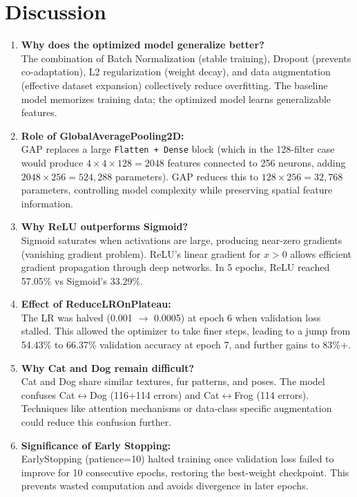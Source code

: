 \documentclass[11pt]{article}
\begin{document}
\section{Discussion}
\begin{enumerate}
    \item \textbf{Why does the optimized model generalize better?}\\
    The combination of Batch Normalization (stable training), Dropout (prevents co-adaptation), L2 regularization (weight decay), and data augmentation (effective dataset expansion) collectively reduce overfitting. The baseline model memorizes training data; the optimized model learns generalizable features.

    \item \textbf{Role of GlobalAveragePooling2D:}\\
    GAP replaces a large \texttt{Flatten + Dense} block (which in the 128-filter case would produce $4\times4\times128 = 2048$ features connected to 256 neurons, adding $2048\times256 = 524,288$ parameters). GAP reduces this to $128\times256 = 32,768$ parameters, controlling model complexity while preserving spatial feature information.

    \item \textbf{Why ReLU outperforms Sigmoid?}\\
    Sigmoid saturates when activations are large, producing near-zero gradients (vanishing gradient problem). ReLU's linear gradient for $x>0$ allows efficient gradient propagation through deep networks. In 5 epochs, ReLU reached 57.05\% vs Sigmoid's 33.29\%.

    \item \textbf{Effect of ReduceLROnPlateau:}\\
    The LR was halved (0.001 $\rightarrow$ 0.0005) at epoch 6 when validation loss stalled. This allowed the optimizer to take finer steps, leading to a jump from 54.43\% to 66.37\% validation accuracy at epoch 7, and further gains to 83\%+.

    \item \textbf{Why Cat and Dog remain difficult?}\\
    Cat and Dog share similar textures, fur patterns, and poses. The model confuses Cat$\leftrightarrow$Dog (116+114 errors) and Cat$\leftrightarrow$Frog (114 errors). Techniques like attention mechanisms or data-class specific augmentation could reduce this confusion further.

    \item \textbf{Significance of Early Stopping:}\\
    EarlyStopping (patience=10) halted training once validation loss failed to improve for 10 consecutive epochs, restoring the best-weight checkpoint. This prevents wasted computation and avoids divergence in later epochs.
\end{enumerate}
\end{document}
